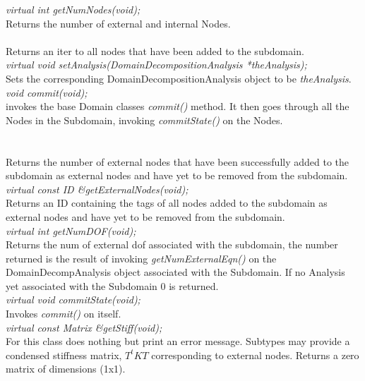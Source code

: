 {\em virtual int getNumNodes(void); } \\
Returns the number of external and internal Nodes. \\

 \\
Returns an iter to all nodes that have been added to the subdomain. \\

{\em virtual void setAnalysis(DomainDecompositionAnalysis *theAnalysis);}\\
Sets the corresponding DomainDecompositionAnalysis object to be {\em
theAnalysis}. \\

{\em void commit(void);} \\
invokes the base Domain classes {\em commit()} method. It then goes through
all the Nodes in the Subdomain, invoking {\em commitState()} on the Nodes. \\


 \\
\\
Returns the number of external nodes that have been successfully added
to the subdomain as external nodes and have yet to be removed from the
subdomain. \\ 

{\em virtual const ID \&getExternalNodes(void);}\\
Returns an ID containing the tags of all nodes added to the subdomain
as external nodes and have yet to be removed from the subdomain. \\

{\em virtual int getNumDOF(void);}\\
Returns the num of external dof associated with the subdomain, the number
returned is the result of invoking {\em getNumExternalEqn()} on
the DomainDecompAnalysis object associated with the Subdomain. If
no Analysis yet associated with the Subdomain $0$ is returned. \\

{\em virtual void commitState(void);}\\ 
Invokes {\em commit()} on itself. \\
    
{\em virtual const Matrix \&getStiff(void);}\\
For this class does nothing but print an error message. Subtypes may
provide a condensed stiffness matrix, $T^tKT$ corresponding to
external nodes. Returns a zero matrix of dimensions (1x1). \\

